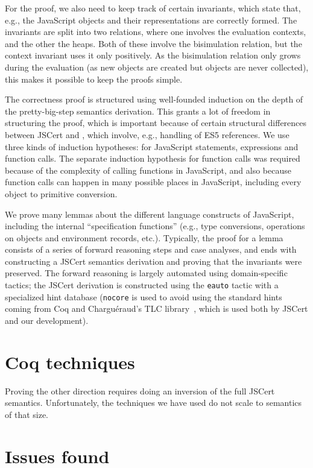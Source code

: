 \documentclass{llncs}
\begin{document}
For the proof, we also need to keep track of certain invariants, which state
that, e.g., the JavaScript objects and their \lambdajs representations are
correctly formed. The invariants are split into two relations, where one
involves the evaluation contexts, and the other the heaps. Both of these involve
the bisimulation relation, but the context invariant uses it only positively. As
the bisimulation relation only grows during the evaluation (as new objects are
created but objects are never collected), this makes it possible to keep the
proofs simple.

The correctness proof is structured using well-founded 
induction on the depth of the \lambdajs pretty-big-step
semantics derivation. This grants a lot of freedom in structuring
the proof, which is important because of certain structural
differences between JSCert and \lambdajs, which involve,
e.g., handling of ES5 references. We use three kinds of induction
hypotheses: for JavaScript statements, expressions and
function calls. The separate induction hypothesis for function
calls was required because of the complexity of calling functions
in JavaScript, and also because function calls can happen in
many possible places in JavaScript, including every
object to primitive conversion.

We prove many lemmas about the different language constructs
of JavaScript, including the internal ``specification functions''
(e.g., type conversions, operations on objects and environment
records, etc.). Typically, the proof for a lemma consists of
a series of forward reasoning steps and case analyses, and ends with
constructing a JSCert semantics derivation and proving that
the invariants were preserved. The forward reasoning is largely
automated using domain-specific tactics; the JSCert derivation
is constructed using the \texttt{eauto} tactic with a specialized
hint database (\texttt{nocore} is used to avoid using the standard
hints coming from Coq and Chargu\'eraud's TLC
library~\cite{TLC}, which is
used both by JSCert and our development).

\section{Coq techniques}
\label{sec:coq-techniques}

Proving the other direction requires doing an inversion of the full JSCert
semantics. Unfortunately, the techniques we have used do not scale to semantics
of that size.

\section{Issues found}
\end{document}
